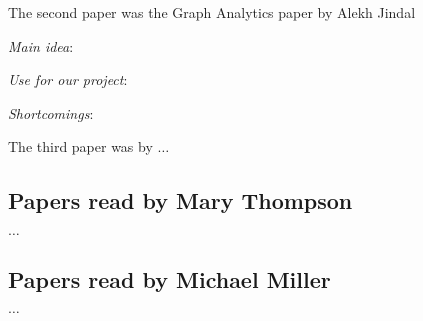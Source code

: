 \documentclass[12pt]{article}
\begin{document}
The second paper was the Graph Analytics paper by Alekh Jindal
\cite{Daubechies92Ten}
\begin{itemize*}
\item {\em Main idea}:


\item {\em Use for our project}:

\item {\em Shortcomings}:
\end{itemize*}

The third paper was by $\ldots$

\subsection{Papers read by Mary Thompson }

$\ldots$

\subsection{Papers read by  Michael Miller }

$\ldots$
\end{document}

